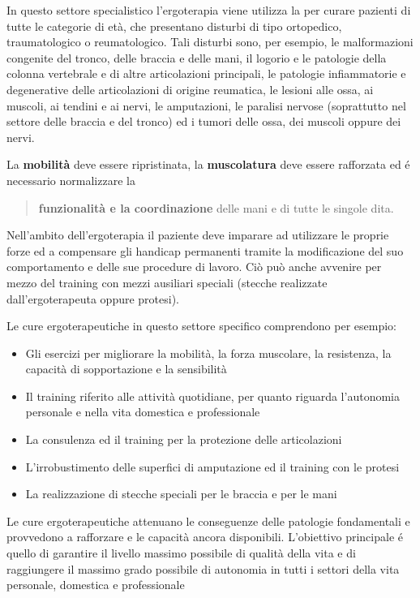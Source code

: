 \documentclass[]{article}
\begin{document}
In questo settore specialistico l'ergoterapia viene utilizza la per
curare pazienti di tutte le categorie di età, che presentano disturbi di
tipo ortopedico, traumatologico o reumatologico. Tali disturbi sono, per
esempio, le malformazioni congenite del tronco, delle braccia e delle
mani, il logorio e le patologie della colonna vertebrale e di altre
articolazioni principali, le patologie infiammatorie e degenerative
delle articolazioni di origine reumatica, le lesioni alle ossa, ai
muscoli, ai tendini e ai nervi, le amputazioni, le paralisi nervose
(soprattutto nel settore delle braccia e del tronco) ed i tumori delle
ossa, dei muscoli oppure dei nervi.

La \textbf{mobilità} deve essere ripristinata, la \textbf{muscolatura}
deve essere rafforzata ed é necessario normalizzare la

\begin{quote}
\textbf{funzionalità e la coordinazione} delle mani e di tutte le
singole dita.
\end{quote}

Nell'ambito dell'ergoterapia il paziente deve imparare ad utilizzare le
proprie forze ed a compensare gli handicap permanenti tramite la
modificazione del suo comportamento e delle sue procedure di lavoro. Ciò
può anche avvenire per mezzo del training con mezzi ausiliari speciali
(stecche realizzate dall'ergoterapeuta oppure protesi).

Le cure ergoterapeutiche in questo settore specifico comprendono per
esempio:

\begin{itemize}
\item
  Gli esercizi per migliorare la mobilità, la forza muscolare, la
  resistenza, la capacità di sopportazione e la sensibilità
\item
  Il training riferito alle attività quotidiane, per quanto riguarda
  l'autonomia personale e nella vita domestica e professionale
\item
  La consulenza ed il training per la protezione delle articolazioni
\item
  L'irrobustimento delle superfici di amputazione ed il training con le
  protesi
\item
  La realizzazione di stecche speciali per le braccia e per le mani
\end{itemize}

Le cure ergoterapeutiche attenuano le conseguenze delle patologie
fondamentali e provvedono a rafforzare e le capacità ancora disponibili.
L'obiettivo principale é quello di garantire il livello massimo
possibile di qualità della vita e di raggiungere il massimo grado
possibile di autonomia in tutti i settori della vita personale,
domestica e professionale
\end{document}
